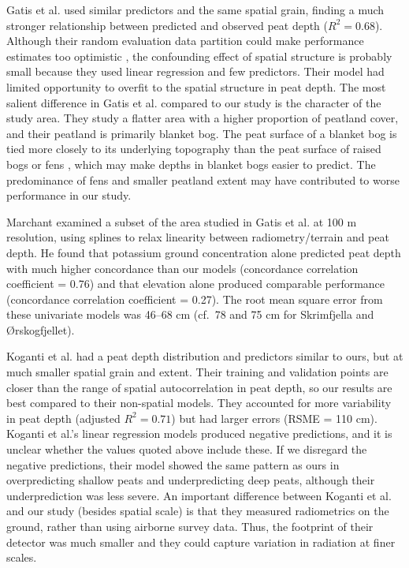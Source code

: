 \documentclass[soil, manuscript]{copernicus}
\begin{document}
Gatis et al. \citeyearpar{gatisMappingUplandPeat2019} used similar predictors and the same spatial grain, finding a much stronger relationship between predicted and observed peat depth (\(R^2 = 0.68\)).
Although their random evaluation data partition could make performance estimates too optimistic \citep{robertsCrossvalidationStrategiesData2017, wadouxSpatialCrossvalidationNot2021}, the confounding effect of spatial structure is probably small because they used linear regression and few predictors.
Their model had limited opportunity to overfit to the spatial structure in peat depth.
The most salient difference in Gatis et al. \citeyearpar{gatisMappingUplandPeat2019} compared to our study is the character of the study area.
They study a flatter area with a higher proportion of peatland cover, and their peatland is primarily blanket bog.
The peat surface of a blanket bog is tied more closely to its underlying topography than the peat surface of raised bogs or fens \citep{lindsayPeatlandMireTypes2016}, which may make depths in blanket bogs easier to predict.
The predominance of fens and smaller peatland extent may have contributed to worse performance in our study.

Marchant \citeyearpar{marchantUsingRemoteSensors2021} examined a subset of the area studied in Gatis et al. \citeyearpar{gatisMappingUplandPeat2019} at 100 m resolution, using splines to relax linearity between radiometry/terrain and peat depth.
He found that potassium ground concentration alone predicted peat depth with much higher concordance than our models (concordance correlation coefficient = 0.76) and that elevation alone produced comparable performance (concordance correlation coefficient = 0.27).
The root mean square error from these univariate models was 46--68 cm (cf.~78 and 75 cm for Skrimfjella and Ørskogfjellet).

Koganti et al. \citeyearpar{kogantiMappingPeatDepth2023} had a peat depth distribution and predictors similar to ours, but at much smaller spatial grain and extent.
Their training and validation points are closer than the range of spatial autocorrelation in peat depth, so our results are best compared to their non-spatial models.
They accounted for more variability in peat depth (adjusted \(R^2 = 0.71\)) but had larger errors (RSME = 110 cm).
Koganti et al.'s \citeyearpar{kogantiMappingPeatDepth2023} linear regression models produced negative predictions, and it is unclear whether the values quoted above include these.
If we disregard the negative predictions, their model showed the same pattern as ours in overpredicting shallow peats and underpredicting deep peats, although their underprediction was less severe.
An important difference between Koganti et al. \citeyearpar{kogantiMappingPeatDepth2023} and our study (besides spatial scale) is that they measured radiometrics on the ground, rather than using airborne survey data.
Thus, the footprint of their detector was much smaller and they could capture variation in radiation at finer scales.
\end{document}
